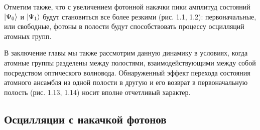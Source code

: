 Отметим также, что с увеличением фотонной накачки пики амплитуд состояний $|\Psi_{0}\rangle$ и $|\Psi_{1}\rangle$ будут становиться все более резкими ({\color{red}рис. 1.1, 1.2}): первоначальные, или свободные, фотоны в полости будут способствовать процессу осцилляций атомных групп.

В заключение главы мы также рассмотрим данную динамику в условиях, когда атомные группы разделены между полостями, взаимодействующими между собой посредством оптического волновода. Обнаруженный эффект перехода состояния атомного ансамбля из одной полости в другую и его возврат в первоначальную полость ({\color{red}рис. 1.13, 1.14}) носит вполне отчетливый характер.

\clearpage
\subsection{Осцилляции с накачкой фотонов}
\vspace{-1em}
\begin{figure}[h!]
	\noindent{}
\end{figure}

